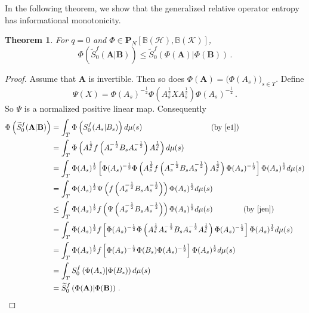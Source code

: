 \documentclass[12pt, reqno]{amsart}
\newtheorem{theorem}{Theorem}[section]
\theoremstyle{definition}
\theoremstyle{remark}
\numberwithin{equation}{section}
\begin{document}
In the following theorem, we show that the generalized relative operator entropy has informational monotonicity.
\begin{theorem}\label{t5}
For $q=0$ and $\Phi \in \mathbf{P}_N[\mathbb{B}(\mathscr{H}),\mathbb{B}(\mathscr{K})]$,
$$
\Phi\left(\widetilde{S}_0^f(\mathbf{A}|\mathbf{B})\right) \le \widetilde{S}_0^f\left(\Phi(\mathbf{A})|\Phi(\mathbf{B})\right)\,.
$$
\end{theorem}
\begin{proof}
Assume that $\mathbf{A}$ is invertible. Then so does $\Phi(\mathbf{A})=\big(\Phi(A_s)\big)_{s\in T}$. Define
$$
\Psi(X)=\Phi(A_s)^{-\frac{1}{2}}\Phi\left(A_s^{\frac{1}{2}}XA_s^{\frac{1}{2}}\right)\Phi(A_s)^{-\frac{1}{2}}\,.
$$
So $\Psi$ is a normalized positive linear map. Consequently
{\footnotesize
\begin{align*}
\Phi\left(\widetilde{S}_0^f (\mathbf{A}|\mathbf{B})\right)&=\int_T\Phi\left(S_0^f(A_s|B_s)\right)d\mu(s)\quad\quad\quad\quad\quad\quad\quad\quad\quad(\text{by \eqref{e1}})\\
&=\int_T\Phi\left(A_s^{\frac{1}{2}}f\left(A_s^{-\frac{1}{2}}B_sA_s^{-\frac{1}{2}}\right)A_s^{\frac{1}{2}}\right)d\mu(s)\\
&=\int_T\Phi(A_s)^{\frac{1}{2}}\left[\Phi(A_s)^{-\frac{1}{2}} \Phi\left(A_s^{\frac{1}{2}}f\left(A_s^{-\frac{1}{2}}B_sA_s^{-\frac{1}{2}}\right)A_s^{\frac{1}{2}}\right) \Phi(A_s)^{-\frac{1}{2}}\right]\Phi(A_s)^{\frac{1}{2}}d\mu(s)\\
&=\int_T\Phi(A_s)^{\frac{1}{2}}\Psi\left(f\left(A_s^{-\frac{1}{2}}B_sA_s^{-\frac{1}{2}}\right)\right)\Phi(A_s)^{\frac{1}{2}}d\mu(s)\\
&\le\int_T\Phi(A_s)^{\frac{1}{2}}f\left(\Psi\left(A_s^{-\frac{1}{2}}B_sA_s^{-\frac{1}{2}}\right)\right)\Phi(A_s)^{\frac{1}{2}}d\mu(s)\quad\quad\quad\quad(\text{by } \eqref{jen})\\
&=\int_T\Phi(A_s)^{\frac{1}{2}}f\left[\Phi(A_s)^{-\frac{1}{2}}\Phi\left(A_s^{\frac{1}{2}}A_s^{-\frac{1}{2}}B_sA_s^{-\frac{1}{2}}A_s^{\frac{1}{2}}\right)\Phi(A_s)^{-\frac{1}{2}}\right]
\Phi(A_s)^{\frac{1}{2}}d\mu(s)\\
&=\int_T\Phi(A_s)^{\frac{1}{2}}f\left[\Phi(A_s)^{-\frac{1}{2}}\Phi(B_s)\Phi(A_s)^{-\frac{1}{2}}\right]\Phi(A_s)^{\frac{1}{2}}d\mu(s)\\
&=\int_TS_0^f\left(\Phi(A_s)|\Phi(B_s)\right)d\mu(s)\\
&= \widetilde{S}_0^f\left(\Phi(\mathbf{A})|\Phi(\mathbf{B})\right)\,.
\end{align*}}
\end{proof}
\end{document}
